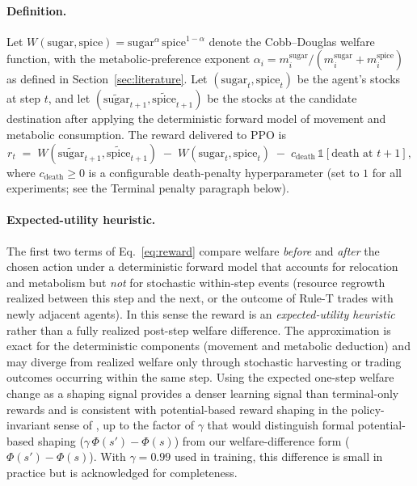 \documentclass[pdflatex,sn-mathphys-num]{sn-jnl}%
\theoremstyle{thmstyleone}%
\theoremstyle{thmstyletwo}%
\theoremstyle{thmstylethree}%
\begin{document}
\paragraph{Definition.}
Let $W(\text{sugar}, \text{spice}) = \text{sugar}^{\alpha}\,\text{spice}^{1-\alpha}$ denote the Cobb--Douglas welfare function, with the metabolic-preference exponent $\alpha_i = m_i^{\text{sugar}} / (m_i^{\text{sugar}} + m_i^{\text{spice}})$ as defined in Section~\ref{sec:literature}.  
Let $(\text{sugar}_t, \text{spice}_t)$ be the agent's stocks at step $t$, and let $(\widetilde{\text{sugar}}_{t+1}, \widetilde{\text{spice}}_{t+1})$ be the stocks at the candidate destination after applying the deterministic forward model of movement and metabolic consumption.  
The reward delivered to PPO is
\begin{equation}
r_t \;=\; W(\widetilde{\text{sugar}}_{t+1}, \widetilde{\text{spice}}_{t+1}) \;-\; W(\text{sugar}_t, \text{spice}_t) \;-\; c_{\text{death}}\,\mathbb{1}[\text{death at }t{+}1],
\label{eq:reward}
\end{equation}
where $c_{\text{death}} \geq 0$ is a configurable death-penalty hyperparameter (set to $1$ for all experiments; see the Terminal penalty paragraph below).

\paragraph{Expected-utility heuristic.}
The first two terms of Eq.~\eqref{eq:reward} compare welfare \emph{before} and \emph{after} the chosen action under a deterministic forward model that accounts for relocation and metabolism but \emph{not} for stochastic within-step events (resource regrowth realized between this step and the next, or the outcome of Rule-T trades with newly adjacent agents).  
In this sense the reward is an \emph{expected-utility heuristic} rather than a fully realized post-step welfare difference.  
The approximation is exact for the deterministic components (movement and metabolic deduction) and may diverge from realized welfare only through stochastic harvesting or trading outcomes occurring within the same step.  
Using the expected one-step welfare change as a shaping signal provides a denser learning signal than terminal-only rewards and is consistent with potential-based reward shaping in the policy-invariant sense of \citet{Ng1999}, up to the factor of $\gamma$ that would distinguish formal potential-based shaping ($\gamma\,\Phi(s') - \Phi(s)$) from our welfare-difference form ($\Phi(s') - \Phi(s)$).  
With $\gamma = 0.99$ used in training, this difference is small in practice but is acknowledged for completeness.
\end{document}
